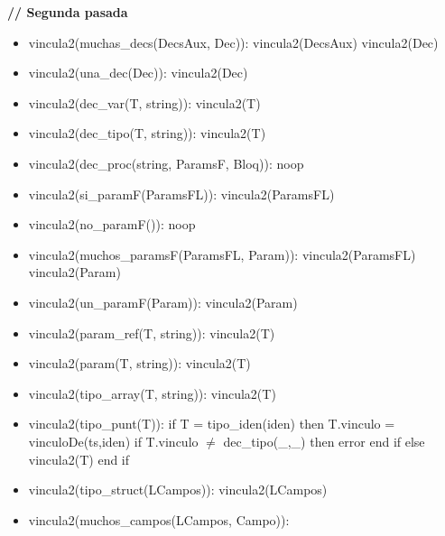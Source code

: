 \documentclass[11pt]{article}
\begin{document}
            \textbf{\/// Segunda pasada}
            \begin{itemize}
                \item vincula2(muchas\_decs(DecsAux, Dec)):
                    \subitem vincula2(DecsAux)
                    \subitem vincula2(Dec)
                \item vincula2(una\_dec(Dec)):
                    \subitem vincula2(Dec)
                \item vincula2(dec\_var(T, string)):
                    \subitem vincula2(T)
                \item vincula2(dec\_tipo(T, string)):
                    \subitem vincula2(T)
                \item vincula2(dec\_proc(string, ParamsF, Bloq)):
                    \subitem noop
                \item vincula2(si\_paramF(ParamsFL)):
                    \subitem vincula2(ParamsFL)
                \item vincula2(no\_paramF()):
                    \subitem noop
                \item vincula2(muchos\_paramsF(ParamsFL, Param)):
                    \subitem vincula2(ParamsFL)
                    \subitem vincula2(Param)
                \item vincula2(un\_paramF(Param)): 
                    \subitem vincula2(Param) 
                \item vincula2(param\_ref(T, string)): 
                    \subitem vincula2(T) 
                \item vincula2(param(T, string)): 
                    \subitem vincula2(T)
                \item vincula2(tipo\_array(T, string)): 
                    \subitem vincula2(T)
                \item vincula2(tipo\_punt(T)): 
                    \subitem if T = tipo\_iden(iden) then 
                        \subsubitem T.vinculo = vinculoDe(ts,iden)
                        \subsubitem if T.vinculo $\neq$ dec\_tipo(\_,\_) then
                            \subsubitem \hspace{2em} error
                        \subsubitem end if
                    \subitem else
                        \subsubitem vincula2(T)
                    \subitem end if
                \item vincula2(tipo\_struct(LCampos)): 
                    \subitem vincula2(LCampos)
                \item vincula2(muchos\_campos(LCampos, Campo)): 

\end{itemize}
\end{document}

